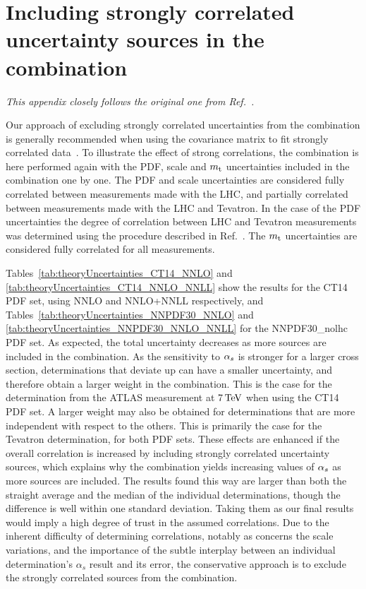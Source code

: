 \section{Including strongly correlated uncertainty sources in the combination}
\label{sec:appendix}

\emph{This appendix closely follows the original one from Ref.~\cite{Klijnsma:2017eqp}.}

Our approach of excluding strongly correlated uncertainties from the combination is generally recommended when using the covariance matrix to fit strongly correlated data~\cite{DAgostini:1993arp}.
% 
To illustrate the effect of strong correlations, the combination is here performed again with the PDF, scale and $m_{\mathrm{t}}$ uncertainties included in the combination one by one.
% 
The PDF and scale uncertainties are considered fully correlated between measurements made with the LHC, and partially correlated between measurements made with the LHC and Tevatron.
% 
In the case of the PDF uncertainties the degree of correlation between LHC and Tevatron measurements was determined using the procedure described in Ref.~\cite{Buckley:2014ana}.
%
The $m_{\mathrm{t}}$ uncertainties are considered fully correlated for all measurements.
% 

Tables~\ref{tab:theoryUncertainties_CT14_NNLO} and \ref{tab:theoryUncertainties_CT14_NNLO_NNLL} show the results for the CT14 PDF set, using NNLO and NNLO+NNLL respectively, and Tables~\ref{tab:theoryUncertainties_NNPDF30_NNLO} and \ref{tab:theoryUncertainties_NNPDF30_NNLO_NNLL} for the NNPDF30\_nolhc PDF set.
% 
As expected, the total uncertainty decreases as more sources are included in the combination.
% 
As the sensitivity to $\alpha_s$ is stronger for a larger cross section, determinations that deviate up can have a smaller uncertainty, and therefore obtain a larger weight in the combination.
% 
This is the case for the determination from the ATLAS measurement at 7$\,\text{TeV}$ when using the CT14 PDF set.
% 
A larger weight may also be obtained for determinations that are more independent with respect to the others. This is primarily the case for the Tevatron determination, for both PDF sets.
% 
These effects are enhanced if the overall correlation is increased by including strongly correlated uncertainty sources, which explains why the combination yields increasing values of $\alpha_s$ as more sources are included.
% 
The results found this way are larger than both the straight average and the median of the individual determinations, though the difference is well within one standard deviation. 
% 
Taking them as our final results would imply a high degree of trust in the assumed correlations.
% 
Due to the inherent difficulty of determining correlations, notably as concerns the scale variations, and the importance of the subtle interplay between an individual determination's $\alpha_s$ result and its error, the conservative approach is to exclude the strongly correlated sources from the combination.
%

